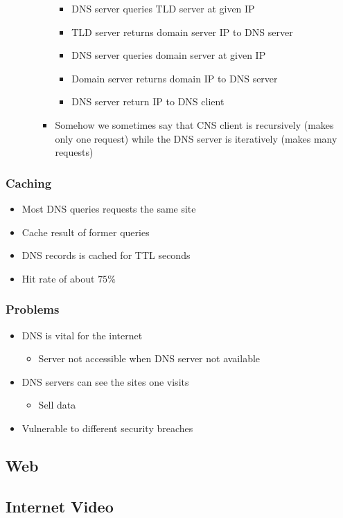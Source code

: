 \begin{itemize}
\begin{itemize}
\begin{itemize}
\begin{itemize}
                            \item DNS server queries TLD server at given IP
                            \item TLD server returns domain server IP to DNS server
                            \item DNS server queries domain server at given IP
                            \item Domain server returns domain IP to DNS server
                            \item DNS server return IP to DNS client
                        \end{itemize}
                    \item Somehow we sometimes say that CNS client is recursively (makes only one request) while the DNS server is iteratively (makes many requests)
                \end{itemize}
        \end{itemize}
\end{itemize}

\subsubsection{Caching}
\begin{itemize}
    \item Most DNS queries requests the same site
    \item Cache result of former queries
    \item DNS records is cached for TTL seconds
    \item Hit rate of about $75\%$
\end{itemize}

\subsubsection{Problems}
\begin{itemize}
    \item DNS is vital for the internet
        \begin{itemize}
            \item Server not accessible when DNS server not available
        \end{itemize}
    \item DNS servers can see the sites one visits
        \begin{itemize}
            \item Sell data
        \end{itemize}
    \item Vulnerable to different security breaches
\end{itemize}

\subsection{Web}
\subsection{Internet Video}
